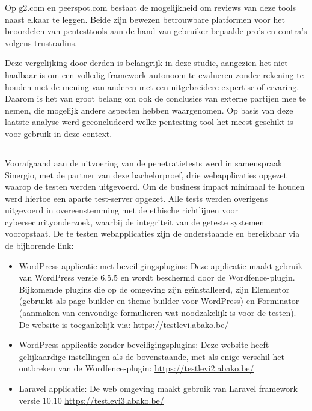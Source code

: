 Op g2.com en peerspot.com bestaat de 
mogelijkheid om reviews van deze tools naast elkaar te leggen. Beide zijn bewezen betrouwbare platformen voor het beoordelen 
van pentesttools aan de hand van gebruiker-bepaalde pro's en contra's volgens trustradius. 

Deze vergelijking door derden is belangrijk in deze studie, aangezien het niet haalbaar is om een volledig framework 
autonoom te evalueren zonder rekening te houden met de mening van anderen met een uitgebreidere expertise of ervaring. Daarom 
is het van groot belang om ook de conclusies van externe partijen mee te nemen, die mogelijk andere 
aspecten hebben waargenomen. Op basis van deze laatste analyse werd geconcludeerd welke pentesting-tool het meest 
geschikt is voor gebruik in deze context.

\subsection{}
Voorafgaand aan de uitvoering van de penetratietests werd in samenspraak Sinergio, met de partner van deze bachelorproef, drie 
webapplicaties opgezet waarop de testen werden uitgevoerd. Om de business impact minimaal te houden werd hiertoe een 
aparte test-server opgezet. Alle tests werden overigens uitgevoerd in overeenstemming met de ethische 
richtlijnen voor cybersecurityonderzoek, waarbij de integriteit van de geteste systemen vooropstaat. De te testen 
webapplicaties zijn de onderstaande en bereikbaar via de bijhorende link:

\begin{itemize}
    \item WordPress-applicatie met beveiligingsplugins: Deze applicatie maakt gebruik van WordPress versie 6.5.5 en wordt 
    beschermd door de Wordfence-plugin. Bijkomende plugins die op de omgeving zijn geïnstalleerd, zijn Elementor 
    (gebruikt als page builder en theme builder voor WordPress) en Forminator (aanmaken van eenvoudige formulieren wat noodzakelijk is voor de testen).  
    De website is toegankelijk via: \url{https://testlevi.abako.be/}
    \item WordPress-applicatie zonder beveiligingsplugins: Deze website heeft gelijkaardige instellingen als de bovenstaande, 
    met als enige verschil het ontbreken van de Wordfence-plugin: \url{https://testlevi2.abako.be/}
    \item Laravel applicatie: De web omgeving maakt gebruik van Laravel framework versie 10.10 \url{https://testlevi3.abako.be/}
\end{itemize}

